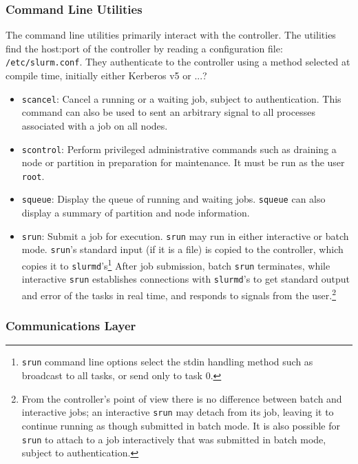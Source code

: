 \subsubsection{Command Line Utilities}

The command line utilities primarily interact with the controller.
The utilities find the host:port of the controller by reading a configuration 
file: {\tt /etc/slurm.conf}.
They authenticate to the controller using a method selected at compile
time, initially either Kerberos v5 or ...?

\begin{itemize}
\item {\tt scancel}: Cancel a running or a waiting job, subject to
authentication. This command can also be used to sent an arbitrary 
signal to all processes associated with a job on all nodes.

\item {\tt scontrol}: Perform privileged administrative commands
such as draining a node or partition in preparation for maintenance. 
It must be run as the user {\tt root}.

\item {\tt squeue}: Display the queue of running and waiting jobs. 
{\tt squeue} can also display a summary of partition and node information.

\item {\tt srun}: Submit a job for execution.  {\tt srun} may run in either
interactive or batch mode.  {\tt srun}'s standard input (if it is a file) is 
copied to the controller, which copies it to {\tt slurmd}'s\footnote{{\tt srun}
command line options select the stdin handling method such as broadcast to 
all tasks, or send only to task 0.}
After job submission, batch {\tt srun} terminates, while interactive 
{\tt srun} establishes connections with {\tt slurmd}'s to get standard output 
and error of the tasks in real time, and responds to signals from the 
user.\footnote{From the controller's point of view there is no difference 
between batch and interactive jobs;  an interactive {\tt srun} may detach from 
its job, leaving it to continue running as though submitted in batch mode.
It is also possible for {\tt srun} to attach to a job interactively that
was submitted in batch mode, subject to authentication.}

\end{itemize}

\subsubsection{Communications Layer}

